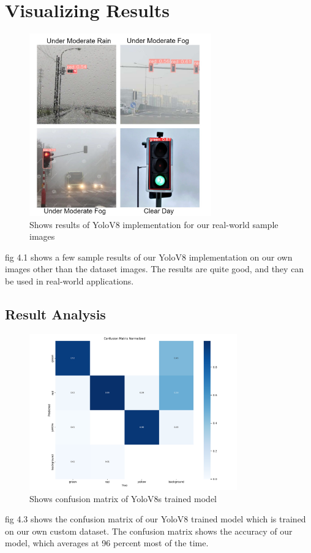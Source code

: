 \documentclass[12 pt]{report}
\begin{document}
\section{Visualizing Results}
 {
  \begin{figure}[h]
    \centering
    \includegraphics[width=0.7\textwidth]{Results-Collgess.jpg}
    \caption{Shows results of YoloV8 implementation for our real-world sample images}
    \label{fig:Results achieved from YoloV8s implementation}
  \end{figure}
  \justify
  \hspace*{1cm} fig 4.1 shows a few sample results of our YoloV8 implementation on our own images other than the dataset images. The results are quite good, and they can be used in real-world applications.
  \newpage
  \subsection{Result Analysis}
  {
    \begin{figure}[h]
      \centering
      \includegraphics[width=0.8\textwidth]{confusion_matrix_normalized.png}
      \caption{Shows confusion matrix of YoloV8s trained model}
      \label{fig:Confusion Matrix YoloV8 Trained Model}
    \end{figure}
    \justify
    \hspace*{1cm} fig 4.3 shows the confusion matrix of our YoloV8 trained model which is trained on our own custom dataset. The confusion matrix shows the accuracy of our model, which averages at 96 percent most of the time.

}}
\end{document}
